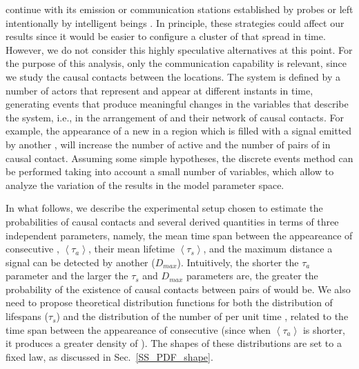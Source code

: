 continue with its emission or communication stations established by
probes or left intentionally by intelligent beings \citep[see, e.g.,
][]{peters_outer_2018, barlow_galactic_2013}.
%
In principle, these strategies could affect our results since it would
be easier to configure a cluster of \cetis{} that spread in time.
%
However, we do not consider this highly speculative alternatives at
this point.
%
%
For the purpose of this analysis, only the communication capability is
relevant, since we study the causal contacts between the locations.
%
The system is defined by a number of actors that represent \cetis{} and
appear at different instants in time, generating events that produce
meaningful changes in the variables that describe the system, i.e., in
the arrangement of \cetis{} and their network of causal contacts.
%
For example, the appearance of a new \ceti{} in a region which is filled
with a signal emitted by another \ceti{}, will increase the number of
active \cetis{} and the number of pairs of \cetis{} in causal contact.
%
Assuming some simple hypotheses, the discrete events method can be
performed taking into account a small number of variables, which allow
to analyze the variation of the results in the model parameter space.


In what follows, we describe the experimental setup chosen to estimate
the probabilities of causal contacts and several derived quantities in
terms of three independent parameters, namely, the mean time span
between the appeareance of consecutive \cetis{}, $\left<\tau_a\right>$, their mean
lifetime $\left<\tau_s\right>$, and the maximum distance a signal can be
detected by another \ceti{} ($D_{max}$).
%
Intuitively, the shorter the $\tau_a$ parameter and the larger the
$\tau_s$ and $D_{max}$ parameters are, the greater the probability of
the existence of causal contacts between pairs of \cetis{} would be.
%
We also need to propose theoretical distribution functions for both
the distribution of lifespans ($\tau_s$) and the distribution of the
number of \cetis{} per unit time \citep{maccone_evolution_2014,
Sotos_biotechnology_2019}, related to the time span between the
appeareance of consecutive \cetis{} (since when $\left<\tau_a\right>$ is shorter, it
produces a greater density of \cetis{}).
%
The shapes of these distributions are set to a fixed law, as discussed
in Sec.~\ref{SS_PDF_shape}.
     

